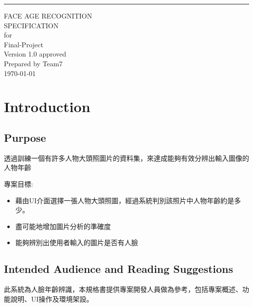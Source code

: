 \documentclass{scrreprt}
\date{}
\def\myversion{1.0 }
\begin{document}
\begin{CJK}{UTF8}{bkai}
\begin{flushright}
    \rule{16cm}{5pt}\vskip1cm
    \begin{bfseries}
        \Huge{FACE AGE RECOGNITION\\ SPECIFICATION}\\
        \vspace{1.9cm}
        for\\
        \vspace{1.9cm}
        Final-Project\\
        \vspace{1.9cm}
        \LARGE{Version \myversion approved}\\
        \vspace{1.9cm}
        Prepared by Team7\\
        \vspace{1.9cm}
        \today\\
    \end{bfseries}
\end{flushright}

\tableofcontents

\chapter{Introduction}

\section{Purpose}
透過訓練一個有許多人物大頭照圖片的資料集，來達成能夠有效分辨出輸入圖像的人物年齡
\begin{description}
    \item 專案目標:
    \begin{itemize}
        \item 藉由UI介面選擇一張人物大頭照圖，經過系統判別該照片中人物年齡約是多少。
        \item 盡可能地增加圖片分析的準確度
        \item 能夠辨別出使用者輸入的圖片是否有人臉
    \end{itemize}
\end{description}

\section{Intended Audience and Reading Suggestions}
此系統為人臉年齡辨識，本規格書提供專案開發人員做為參考，包括專案概述、功能說明、UI操作及環境架設。


\end{CJK}
\end{document}
